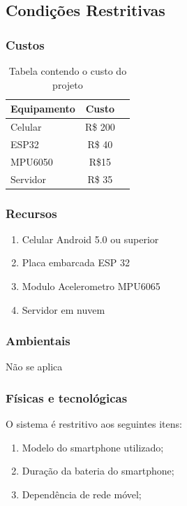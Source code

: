 \subsection{Condições Restritivas}
\subsubsection{Custos}

\begin{table}[h!]
  \begin{center}
    \caption{Tabela contendo o custo do projeto }
    \label{tab:table1}
    \begin{tabular}{l|S|r}
      \textbf{Equipamento} & \textbf{Custo} \\
    
      \hline
      Celular & R\$ 200  \\
      ESP32 & R\$ 40 \\
      MPU6050 & R\$15 \\
      Servidor & R\$ 35 \\
      
    \end{tabular}
  \end{center}
\end{table}

\clearpage
\subsubsection{Recursos}

\begin{enumerate}
    \item Celular Android 5.0 ou superior
    \item Placa embarcada ESP 32
    \item Modulo Acelerometro MPU6065
    \item Servidor em nuvem
\end{enumerate}


\subsubsection{Ambientais}
Não se aplica
\subsubsection{Físicas e tecnológicas}
O sistema é restritivo aos seguintes itens:
\begin{enumerate}
    \item Modelo do smartphone utilizado;
    \item Duração da bateria do smartphone;
    \item Dependência de rede móvel;
\end{enumerate}

